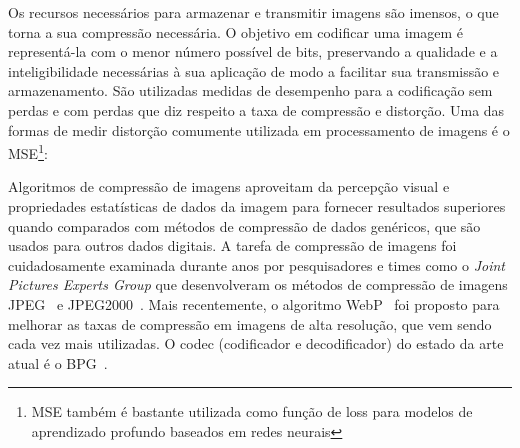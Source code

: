 Os recursos necessários para armazenar e transmitir imagens são imensos, o que torna a sua compressão necessária. O objetivo em codificar uma imagem é representá-la com o menor número possível de bits, preservando a qualidade e a inteligibilidade necessárias à sua aplicação de modo a facilitar sua transmissão e armazenamento. São utilizadas medidas de desempenho para a codificação sem perdas e com perdas que diz respeito a taxa de compressão e distorção. Uma das formas de medir distorção comumente utilizada em processamento de imagens é o \acrshort{MSE}\footnote{MSE também é bastante utilizada como função de loss para modelos de aprendizado profundo baseados em redes neurais}: 

Algoritmos de compressão de imagens aproveitam da percepção visual e propriedades estatísticas de dados da imagem para fornecer resultados superiores quando comparados com métodos de compressão de dados genéricos, que são usados para outros dados digitais. A tarefa de compressão de imagens foi cuidadosamente examinada durante anos por pesquisadores e times como o \textit{Joint Pictures Experts Group} que desenvolveram os métodos de compressão de imagens JPEG~\cite{jpeg1993} e JPEG2000~\cite{jpeg2000}. Mais recentemente, o algoritmo WebP~\cite{webp} foi proposto para melhorar as taxas de compressão em imagens de alta resolução, que vem sendo cada vez mais utilizadas. O codec (codificador e decodificador) do estado da arte atual é o BPG~\cite{bpg}.

